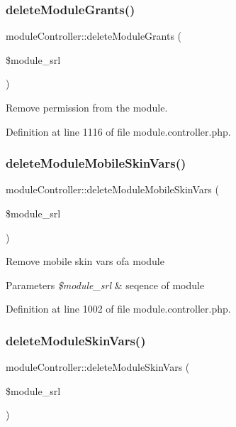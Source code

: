 \subsubsection{\texorpdfstring{delete\+Module\+Grants()}{deleteModuleGrants()}}
{\footnotesize\ttfamily module\+Controller\+::delete\+Module\+Grants (\begin{DoxyParamCaption}\item[{}]{\$module\+\_\+srl }\end{DoxyParamCaption})}



Remove permission from the module. 



Definition at line 1116 of file module.\+controller.\+php.

\hypertarget{classmoduleController_a16feed706aef2613cc417c68cb06ba8a}{}\label{classmoduleController_a16feed706aef2613cc417c68cb06ba8a} 
\subsubsection{\texorpdfstring{delete\+Module\+Mobile\+Skin\+Vars()}{deleteModuleMobileSkinVars()}}
{\footnotesize\ttfamily module\+Controller\+::delete\+Module\+Mobile\+Skin\+Vars (\begin{DoxyParamCaption}\item[{}]{\$module\+\_\+srl }\end{DoxyParamCaption})}

Remove mobile skin vars ofa module 
\begin{DoxyParams}{Parameters}
{\em \$module\+\_\+srl} & seqence of module \\
\hline
\end{DoxyParams}


Definition at line 1002 of file module.\+controller.\+php.

\hypertarget{classmoduleController_ad85915b5cf2a31804f673cfc3320ac75}{}\label{classmoduleController_ad85915b5cf2a31804f673cfc3320ac75} 
\subsubsection{\texorpdfstring{delete\+Module\+Skin\+Vars()}{deleteModuleSkinVars()}}
{\footnotesize\ttfamily module\+Controller\+::delete\+Module\+Skin\+Vars (\begin{DoxyParamCaption}\item[{}]{\$module\+\_\+srl }\end{DoxyParamCaption})}

